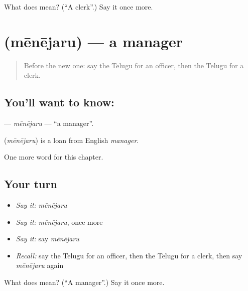 \begin{tcolorbox}[breakable,colback=teal!4,colframe=teal!35!black,title={Before you move on}]
What does  mean? (\textquotedblleft{}A clerk\textquotedblright{}.) Say it once more.
\end{tcolorbox}
\section[\texorpdfstring{\te{మేనేజరు} (mēnējaru)}{మేనేజరు (mēnējaru)}]{ (mēnējaru) — a manager}

\label{lesson:TE-C195-menejaru}



\begin{quote}
Before the new one: say the Telugu for an officer, then the Telugu for a clerk.
\end{quote}

\subsection*{You'll want to know: }
\textbf{} — \emph{mēnējaru} — \textquotedblleft{}a manager\textquotedblright{}.

\begin{cousinweb}
\textbf{} (\emph{mēnējaru}) is a loan from English \emph{manager}.
\end{cousinweb}

\begin{grammarlens}[title={What you've built}]
One more word for this chapter.
\end{grammarlens}

\subsection*{Your turn}
\begin{itemize}
\raggedright
  \item \emph{Say it:} \emph{mēnējaru}
  \item \emph{Say it:} \emph{mēnējaru}, once more
  \item \emph{Say it:} say \emph{mēnējaru}
  \item \emph{Recall:} say the Telugu for an officer, then the Telugu for a clerk, then say \emph{mēnējaru} again
\end{itemize}

\begin{tcolorbox}[breakable,colback=teal!4,colframe=teal!35!black,title={Before you move on}]
What does  mean? (\textquotedblleft{}A manager\textquotedblright{}.) Say it once more.
\end{tcolorbox}
